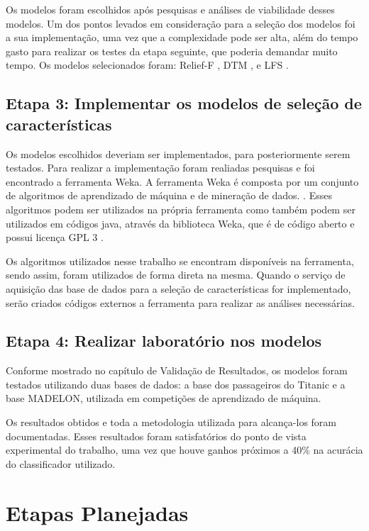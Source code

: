 Os modelos foram escolhidos após pesquisas e análises de viabilidade desses modelos. Um dos pontos levados em consideração para a seleção dos modelos foi a sua implementação, uma vez que a complexidade pode ser alta, além do tempo gasto para realizar os testes da etapa seguinte, que poderia demandar muito tempo. Os modelos selecionados foram: Relief-F \cite{dash_1997}, DTM \cite{dash_1997}, e LFS \cite{gutlein_2009}.

\subsection{Etapa 3: Implementar os modelos de seleção de características}

Os modelos escolhidos deveriam ser implementados, para posteriormente serem testados. Para realizar a implementação foram realiadas pesquisas e foi encontrado a ferramenta Weka. A ferramenta Weka é composta por um conjunto de algoritmos de aprendizado de máquina e de mineração de dados. \cite{weka_2005}. Esses algoritmos podem ser utilizados na própria ferramenta como também podem ser utilizados em códigos java, através da biblioteca Weka, que é de código aberto e possui licença GPL 3 \cite{gpl_2007}.

Os algoritmos utilizados nesse trabalho se encontram disponíveis na ferramenta, sendo assim, foram utilizados de forma direta na mesma. Quando o serviço de aquisição das base de dados para a seleção de características for implementado, serão criados códigos externos a ferramenta para realizar as análises necessárias.

\subsection{Etapa 4: Realizar laboratório nos modelos}

Conforme mostrado no capítulo de Validação de Resultados, os modelos foram testados utilizando duas bases de dados: a base dos passageiros do Titanic e a base MADELON, utilizada em competições de aprendizado de máquina. 

Os resultados obtidos e toda a metodologia utilizada para alcança-los foram documentadas. Esses resultados foram satisfatórios do ponto de vista experimental do trabalho, uma vez que houve ganhos próximos a 40\% na acurácia do classificador utilizado.

\section{Etapas Planejadas}

